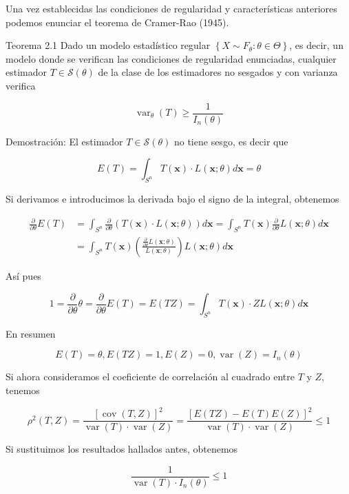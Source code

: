 \documentclass[
]{article}
\begin{document}
Una vez establecidas las condiciones de regularidad y características anteriores podemos enunciar el teorema de Cramer-Rao (1945).

Teorema 2.1 Dado un modelo estadístico regular \(\left\{X \sim F_{\theta}: \theta \in \Theta\right\}\), es decir, un modelo donde se verifican las condiciones de regularidad enunciadas, cualquier estimador \(T \in \mathcal{S}(\theta)\) de la clase de los estimadores no sesgados y con varianza verifica

\[
\operatorname{var}_{\theta}(T) \geq \frac{1}{I_{n}(\theta)}
\]

Demostración:
El estimador \(T \in \mathcal{S}(\theta)\) no tiene sesgo, es decir que

\[
E(T)=\int_{S^{n}} T(\mathbf{x}) \cdot L(\mathbf{x} ; \theta) d \mathbf{x}=\theta
\]

Si derivamos e introducimos la derivada bajo el signo de la integral, obtenemos

\[
\begin{aligned}
\frac{\partial}{\partial \theta} E(T) & =\int_{S^{n}} \frac{\partial}{\partial \theta}(T(\mathbf{x}) \cdot L(\mathbf{x} ; \theta)) d \mathbf{x}=\int_{S^{n}} T(\mathbf{x}) \frac{\partial}{\partial \theta} L(\mathbf{x} ; \theta) d \mathbf{x} \\
& =\int_{S^{n}} T(\mathbf{x})\left(\frac{\frac{\partial}{\partial \theta} L(\mathbf{x} ; \theta)}{L(\mathbf{x} ; \theta)}\right) L(\mathbf{x} ; \theta) d \mathbf{x}
\end{aligned}
\]

Así pues

\[
1=\frac{\partial}{\partial \theta} \theta=\frac{\partial}{\partial \theta} E(T)=E(T Z)=\int_{S^{n}} T(\mathbf{x}) \cdot Z L(\mathbf{x} ; \theta) d \mathbf{x}
\]

En resumen

\[
E(T)=\theta, E(T Z)=1, E(Z)=0, \operatorname{var}(Z)=I_{n}(\theta)
\]

Si ahora consideramos el coeficiente de correlación al cuadrado entre \(T\) y \(Z\), tenemos

\[
\rho^{2}(T, Z)=\frac{[\operatorname{cov}(T, Z)]^{2}}{\operatorname{var}(T) \cdot \operatorname{var}(Z)}=\frac{[E(T Z)-E(T) E(Z)]^{2}}{\operatorname{var}(T) \cdot \operatorname{var}(Z)} \leq 1
\]

Si sustituimos los resultados hallados antes, obtenemos

\[
\frac{1}{\operatorname{var}(T) \cdot I_{n}(\theta)} \leq 1
\]
\end{document}

